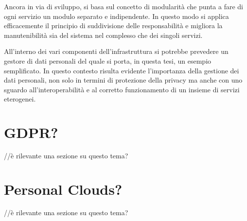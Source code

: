 Ancora in via di sviluppo, si basa sul concetto di modularità che punta a fare di ogni servizio un modulo separato e indipendente. In questo modo si applica efficacemente il principio di suddivisione delle responsabilità e migliora la manutenibilità sia del sistema nel complesso che dei singoli servizi.

All’interno dei vari componenti dell’infrastruttura si potrebbe prevedere un gestore di dati personali del quale si porta, in questa tesi, un esempio semplificato. In questo contesto risulta evidente l’importanza della gestione dei dati personali, non solo in termini di protezione della privacy ma anche con uno sguardo all’interoperabilità e al corretto funzionamento di un insieme di servizi eterogenei.

\section{GDPR?}
//è rilevante una sezione su questo tema?

\section{Personal Clouds?}
//è rilevante una sezione su questo tema?
